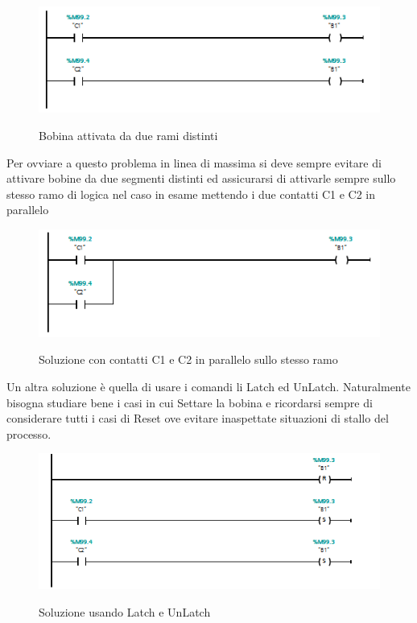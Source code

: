 \documentclass[12pt, a4paper, oneside]{book}
\begin{document}
	\begin{figure}[H]
		\centering
		\includegraphics[width=12cm]{Immagini/LAD1}
		\label{lad1}
		\caption{Bobina attivata da due rami distinti}
	\end{figure}

	Per ovviare a questo problema in linea di massima si deve sempre evitare di attivare bobine da due segmenti distinti ed assicurarsi di attivarle sempre sullo stesso ramo di logica nel caso in esame mettendo i due contatti C1 e C2 in parallelo
	
		\begin{figure}[H]
		\centering
		\includegraphics[width=12cm]{Immagini/LAD2}
		\label{lad2}
		\caption{ Soluzione con contatti C1 e C2 in parallelo sullo stesso ramo}
	\end{figure}
	
	Un altra soluzione è quella di usare i comandi li Latch ed UnLatch. Naturalmente bisogna studiare bene i casi in cui Settare la bobina e ricordarsi sempre di considerare tutti i casi di Reset ove evitare inaspettate situazioni di stallo del processo. 
	
		\begin{figure}[H]
		\centering
		\includegraphics[width=12cm]{Immagini/LAD3}
		\label{lad3}
		\caption{ Soluzione usando Latch e UnLatch}
	\end{figure}
	
\end{document}
